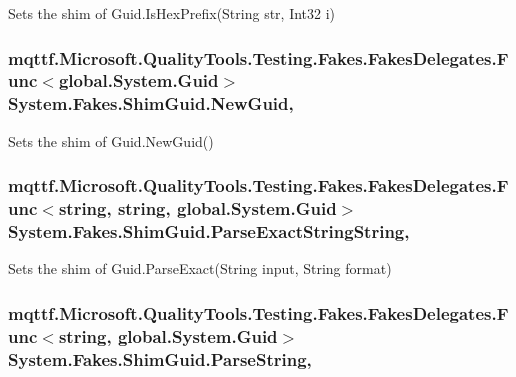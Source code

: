 Sets the shim of Guid.\-Is\-Hex\-Prefix(\-String str, Int32 i)

\hypertarget{class_system_1_1_fakes_1_1_shim_guid_aa44e40ba11ad258b623c03fac4a93d38}{
\subsubsection[{New\-Guid}]{\setlength{\rightskip}{0pt plus 5cm}mqttf.\-Microsoft.\-Quality\-Tools.\-Testing.\-Fakes.\-Fakes\-Delegates.\-Func$<$global.\-System.\-Guid$>$ System.\-Fakes.\-Shim\-Guid.\-New\-Guid\hspace{0.3cm}{\ttfamily [static]}, {\ttfamily [set]}}}\label{class_system_1_1_fakes_1_1_shim_guid_aa44e40ba11ad258b623c03fac4a93d38}


Sets the shim of Guid.\-New\-Guid()

\hypertarget{class_system_1_1_fakes_1_1_shim_guid_a6cdf4b817a4e5678f3476b6ee7a5d12b}{
\subsubsection[{Parse\-Exact\-String\-String}]{\setlength{\rightskip}{0pt plus 5cm}mqttf.\-Microsoft.\-Quality\-Tools.\-Testing.\-Fakes.\-Fakes\-Delegates.\-Func$<$string, string, global.\-System.\-Guid$>$ System.\-Fakes.\-Shim\-Guid.\-Parse\-Exact\-String\-String\hspace{0.3cm}{\ttfamily [static]}, {\ttfamily [set]}}}\label{class_system_1_1_fakes_1_1_shim_guid_a6cdf4b817a4e5678f3476b6ee7a5d12b}


Sets the shim of Guid.\-Parse\-Exact(\-String input, String format)

\hypertarget{class_system_1_1_fakes_1_1_shim_guid_ac2e4b47df4ae2f693bb1d626960bed9a}{
\subsubsection[{Parse\-String}]{\setlength{\rightskip}{0pt plus 5cm}mqttf.\-Microsoft.\-Quality\-Tools.\-Testing.\-Fakes.\-Fakes\-Delegates.\-Func$<$string, global.\-System.\-Guid$>$ System.\-Fakes.\-Shim\-Guid.\-Parse\-String\hspace{0.3cm}{\ttfamily [static]}, {\ttfamily [set]}}}\label{class_system_1_1_fakes_1_1_shim_guid_ac2e4b47df4ae2f693bb1d626960bed9a}



